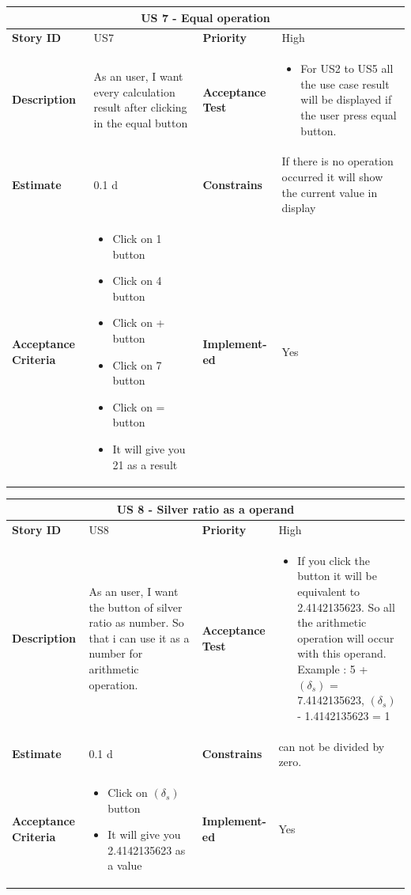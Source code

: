 \documentclass{article}
\begin{document}
\begin{tabular}{ |p{2cm}|p{5cm}|p{2cm}|p{4cm}| }
 \hline
 \multicolumn{4}{|c|}{US 7 - Equal operation} \\
 \hline
 \textbf {Story ID}& US7 &  \textbf{Priority} & High \\
 \hline
  \textbf{Description}   & As an user, I want every calculation result after clicking in the equal button &    \textbf{Acceptance Test}& 
\begin{itemize}
\item For US2 to US5 all the use case result will be displayed if the user press equal button. 
\end{itemize}
  \\
 \hline
 \textbf{Estimate} & 0.1 d &  \textbf{Constrains}& If there is no operation occurred it will show the current value in display   \\
 \hline
 \textbf{Acceptance Criteria} & 
 \begin{itemize}
\item Click on 1 button
\item Click on 4 button
\item Click on + button
\item Click on 7 button
\item Click on = button
\item It will give you 21 as a result 
\end{itemize}
 &  \textbf{Implement- ed}& Yes  \\
 \hline
\end{tabular}

\begin{tabular}{ |p{2cm}|p{5cm}|p{2cm}|p{4cm}| }
 \hline
 \multicolumn{4}{|c|}{US 8 - Silver ratio as a operand} \\
 \hline
 \textbf {Story ID}& US8 &  \textbf{Priority} & High \\
 \hline
  \textbf{Description}   & As an user, I want the button of silver ratio as number. So that i can use it as a number for arithmetic operation. &    \textbf{Acceptance Test}& 
\begin{itemize}
\item  If you click the button it will be equivalent to 2.4142135623. So all the arithmetic operation will occur with this operand. Example : 5 + $(\delta_s)$ = 7.4142135623, $(\delta_s)$ - 1.4142135623 = 1
\end{itemize}
  \\
 \hline
 \textbf{Estimate} & 0.1 d &  \textbf{Constrains}&  can not be divided by zero.  \\
 \hline
 \textbf{Acceptance Criteria} & 
 \begin{itemize}
\item Click on $(\delta_s)$ button
\item It will give you 2.4142135623 as a value 
\end{itemize}
 &  \textbf{Implement- ed}& Yes  \\
 \hline
\end{tabular}
\end{document}
